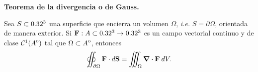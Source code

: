 \begin{theorem}
\textbf{Teorema de la divergencia o de Gauss.} 

Sea $S\subset0.32^3$ una superficie que encierra un volumen $\Omega$, \textit{i.e.} $S=\partial \Omega$, orientada de manera exterior.  Si $\mathbf{F}:A \subset 0.32^3 \to0.32^3$ es  un campo vectorial continuo y de clase $\mathcal{C}^1({\kern0ptA}^{\mathrm{o}})$ tal que $\Omega \subset {\kern0ptA}^{\mathrm{o}}$, entonces
\[
    \oiint_{\partial \Omega}\mathbf{F}\cdot d\mathbf{S}=\iiint_{\Omega}\grad\cdot\mathbf{F}\:dV.
\]
\end{theorem}